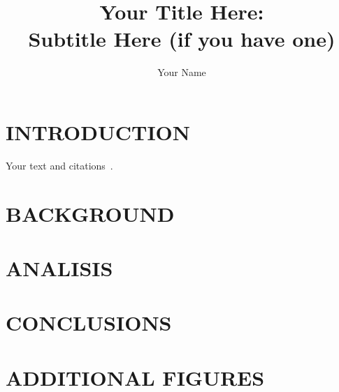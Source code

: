\documentclass [PhD] {ucfthes}
\title          {Your Title Here:\\
		Subtitle Here (if you have one)}
\author         {Your Name}
\begin{document}
\makeintropages


\chapter{INTRODUCTION}
Your text and citations~\cite{wu:gpem02}.

\chapter{BACKGROUND}

\chapter{ANALISIS}

\chapter{CONCLUSIONS}



\appendix

\chapter{ADDITIONAL FIGURES}

\end{document}
